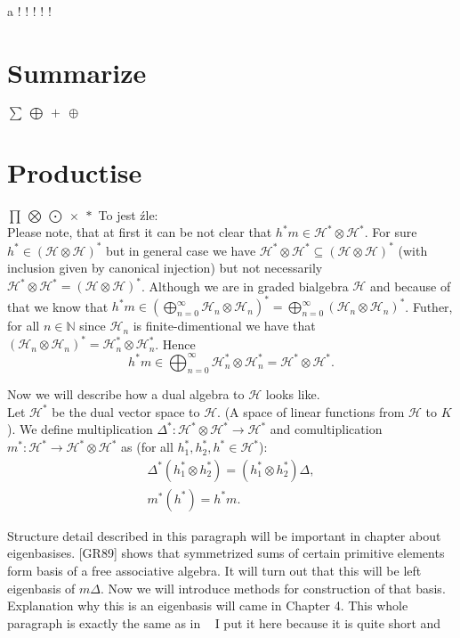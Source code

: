 \documentclass[a4paper]{article}
\begin{document}
a ! \large! \Large! \huge! \Huge! \normalsize

\section{Summarize}
$\displaystyle\sum\ \bigoplus\ +\ \oplus$

\section{Productise}
$\displaystyle\prod\ \bigotimes\ \bigodot\ \times\ *$
\hfill \break
To jest źle: \\
Please note, that at first it can be not clear that $h^*m \in \mathcal{H}^* \otimes \mathcal{H}^*$. 
For sure $h^* \in (\mathcal{H} \otimes \mathcal{H})^*$ but in general case we have 
$ \mathcal{H}^* \otimes \mathcal{H}^* \subseteq (\mathcal{H} \otimes \mathcal{H})^*$ (with inclusion given by 
canonical injection) but not necessarily 
$ \mathcal{H}^* \otimes \mathcal{H}^* = (\mathcal{H} \otimes \mathcal{H})^*$.
Although we are in graded bialgebra $\mathcal{H}$ and because of that we know that 
$h^*m \in \displaystyle\left(\bigoplus^\infty_{n=0}\mathcal{H}_n \otimes \mathcal{H}_n\right)^* = 
\displaystyle\bigoplus^\infty_{n = 0} (\mathcal{H}_n \otimes \mathcal{H}_n)^*$. Futher, for all 
$n \in \mathbb{N}$ since $\mathcal{H}_n$ is finite-dimentional we have that
$(\mathcal{H}_n \otimes \mathcal{H}_n)^* = \mathcal{H}_n^* \otimes \mathcal{H}_n^*$. 
Hence 
\begin{equation*}
h^*m \in \displaystyle\bigoplus^\infty_{n = 0} \mathcal{H}_n^* \otimes \mathcal{H}^*_n = 
\mathcal{H}^* \otimes \mathcal{H}^*.
\end{equation*}

Now we will describe how a dual algebra to $\mathcal{H}$ looks like. \\
Let $\mathcal{H}^*$ be the dual vector space to $\mathcal{H}$. (A space of linear functions from 
$\mathcal{H}$ to $K$). We define multiplication 
$\Delta^* : \mathcal{H}^* \otimes \mathcal{H}^* \to \mathcal{H}^*$ and comultiplication 
$m^* : \mathcal{H}^* \to \mathcal{H}^* \otimes \mathcal{H}^*$ as 
(for all $h_1^*, h_2^*, h^* \in \mathcal{H}^*$):
\begin{align*}
\Delta^*(h_1^* \otimes h_2^*) = (h_1^* \otimes h_2^*)\Delta, \\
m^*(h^*) = h^*m.
\end{align*}

Structure detail described in this paragraph will be important in chapter about eigenbasises. 
[GR89] shows that symmetrized sums of certain primitive elements form basis of a free associative algebra. 
It will turn out that this will be left eigenbasis of $m\Delta$. Now we will introduce methods for 
construction of that basis. Explanation why this is an eigenbasis will came in Chapter 4. This whole 
paragraph is exactly the same as in ~\cite{Diaconis2014} I put it here because it is quite short and \\
\end{document}
